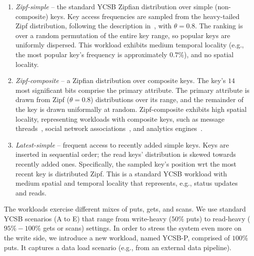 \begin{enumerate}
\item {\em Zipf-simple} -- the standard YCSB Zipfian distribution over simple (non-composite) keys. 
Key access frequencies are sampled from the heavy-tailed Zipf distribution, 
following the description in~\cite{Gray:1994:QGB:191839.191886}, with $\theta = 0.8$. 
The ranking is over a random permutation of the entire key range, so popular keys are uniformly dispersed.
This workload exhibits 
medium temporal locality (e.g., the most popular key's frequency is approximately $0.7\%$), 
and no spatial locality. 

\item {\em Zipf-composite}  -- a Zipfian distribution over composite keys. 
The key's $14$ most significant bits comprise the primary attribute. 
The primary attribute is drawn from Zipf ($\theta=0.8$) distributions over its range, and  the remainder of the key is drawn uniformally at random.
Zipf-composite exhibits high spatial locality, representing workloads 
with composite keys, such as message threads~\cite{Borthakur:2011:AHG:1989323.1989438},
social network associations~\cite{Armstrong:2013:LDB:2463676.2465296}, and analytics engines~\cite{flurry}. 

\item {\em Latest-simple} -- frequent access to recently added simple keys. 
Keys are inserted in sequential  order; the read keys' distribution is skewed towards recently added ones. 
Specifically, the sampled key's position wrt the most recent key is distributed Zipf. This is a 
standard YCSB workload with medium spatial and temporal locality that represents, e.g., status updates and reads. 
\end{enumerate}

The workloads exercise different mixes of puts, gets, and scans. We use standard YCSB scenarios 
(A to E) that range from write-heavy ($50\%$ puts) to read-heavy ($95\%-100\%$ gets or scans) settings. 
In order to stress the system even more on the write side, we introduce a new workload, named 
YCSB-P, comprised of $100\%$ puts. It captures a data load scenario (e.g., from an 
external data pipeline). 

